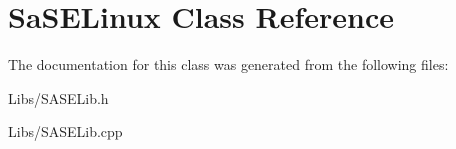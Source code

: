 \hypertarget{class_sa_s_e_linux}{}\section{Sa\+S\+E\+Linux Class Reference}
\label{class_sa_s_e_linux}


The documentation for this class was generated from the following files\+:\begin{DoxyCompactItemize}
\item 
Libs/S\+A\+S\+E\+Lib.\+h\item 
Libs/S\+A\+S\+E\+Lib.\+cpp\end{DoxyCompactItemize}
